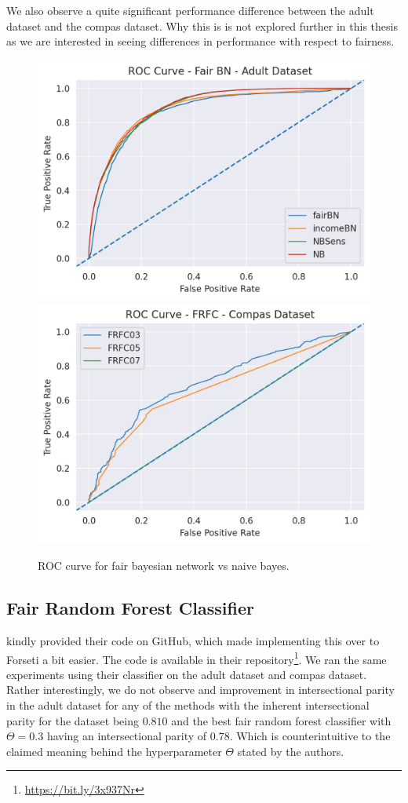 We also observe a quite significant performance difference between the adult dataset and the compas dataset. Why this is is not explored further in this thesis as we are interested in seeing differences in performance with respect to fairness.  
\begin{figure}
    \centering
    \includegraphics[width=0.49\linewidth]{figures/adult_fairbn_roc.png}
    \includegraphics[width=0.49\linewidth]{figures/compas_frfc_roc.png}
    \caption{ROC curve for fair bayesian network vs naive bayes.}
    \label{fig:exp1fairBNROC}
\end{figure}

\subsection{Fair Random Forest Classifier}

\citet{Antonio:2021:arXiv} kindly provided their code on GitHub, which made implementing this over to Forseti a bit easier. The code is available in their repository\footnote{\url{https://bit.ly/3x937Nr}}. We ran the same experiments using their classifier on the adult dataset and compas dataset. Rather interestingly, we do not observe and improvement in intersectional parity in the adult dataset for any of the methods with the inherent intersectional parity for the dataset being $0.810$ and the best fair random forest classifier with $\Theta = 0.3$ having an intersectional parity of $0.78$. Which is counterintuitive to the claimed meaning behind the hyperparameter $\Theta$ stated by the authors.

